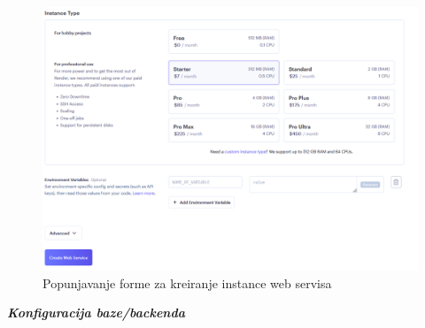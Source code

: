 				\begin{figure}[H]
					\centering
					\includegraphics[width=\textwidth]{slike/create_web_service_part2.png}
					\caption{Popunjavanje forme za kreiranje instance web servisa}
					\label{fig: Render create web service part 2 front}
				\end{figure}
				
			\textbf{\textit{Konfiguracija baze/backenda}}
			
